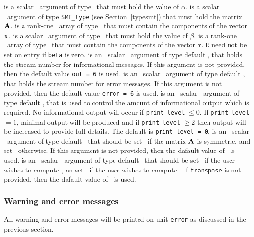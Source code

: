 \documentclass{galahad}
\begin{document}
\begin{description}
   is a scalar \intentin\ argument of type \realdp\ that
     must hold the value of $\alpha$.
   is a scalar \intentin\ argument of type {\tt SMT\_type} (see
     Section~\ref{typesmt}) that must hold the matrix ${\mathbf{A}}$.
   is a rank-one \intentin\ array of type \realdp\ that must
     contain the components of the vector ${\mathbf{x}}$.
   is a scalar \intentin\ argument of type \realdp\ that
     must hold the value of $\beta$.
   is a rank-one \intentinout\ array of type \realdp\ that must
  contain the components of the vector ${\mathbf{r}}$. {\tt R} need not be set
  on entry if {\tt beta} is zero.
   is an \optional\ scalar \intentin\ argument of type default \integer, that holds the
     stream number for informational messages. If this argument is not
     provided, then the default value {\tt out = 6} is used.
   is an \optional\ scalar \intentin\ argument of type default \integer, that holds the
     stream number for error messages. If this argument is not
     provided, then the default value {\tt error = 6} is used.
   is an \optional\ scalar \intentin\ argument of type default \integer, that is used
     to control the amount of informational output which is required. No 
     informational output will occur if {\tt print\_level} $\leq 0$. If 
     {\tt print\_level} $= 1$, minimal output will be produced and if
     {\tt print\_level} $\geq 2$ then output will be
     increased to provide full details.
     The default is {\tt print\_level = 0}.
   is an \optional\ scalar \intentin\ argument of type default
     \logical\ that should be set \true\ if the matrix ${\mathbf{A}}$ is
     symmetric, and set \false\ otherwise.  If this argument is not
     provided, then the dafault value of \false\ is used. 
   is an \optional\ scalar \intentin\ argument of type default
     \logical\ that should be set \false\ if the user wishes to compute
     , an set \true\ if the user wishes to compute .
     If {\tt transpose} is not provided, then the dafault value of
     \false\ is used. 
\end{description}

\subsubsection{Warning and error messages}\label{Ax-error}

All warning and error messages will be printed on unit {\tt error} as
discussed in the previous section.
\end{document}
